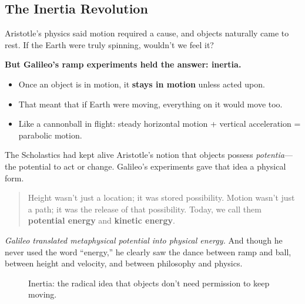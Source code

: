 \subsection{The Inertia Revolution}

Aristotle’s physics said motion required a cause, and objects naturally came to rest. If the Earth were truly spinning, wouldn’t we feel it?

\textbf{But Galileo’s ramp experiments held the answer: inertia.}

\begin{itemize}
    \item Once an object is in motion, it \textbf{stays in motion} unless acted upon.
    \item That meant that if Earth were moving, everything on it would move too.
    \item Like a cannonball in flight: steady horizontal motion + vertical acceleration = parabolic motion.
\end{itemize}


The Scholastics had kept alive Aristotle’s notion that objects possess \textit{potentia}—the potential to act or change. Galileo’s experiments gave that idea a physical form.

\begin{quote}
Height wasn’t just a location; it was stored possibility. Motion wasn’t just a path; it was the release of that possibility. Today, we call them \textbf{potential energy} and \textbf{kinetic energy}.
\end{quote}

\textit{Galileo translated metaphysical potential into physical energy.} And though he never used the word “energy,” he clearly saw the dance between ramp and ball, between height and velocity, and between philosophy and physics.

\begin{figure}[H]
\centering
{}
\caption{Inertia: the radical idea that objects don’t need permission to keep moving.}
\end{figure}

